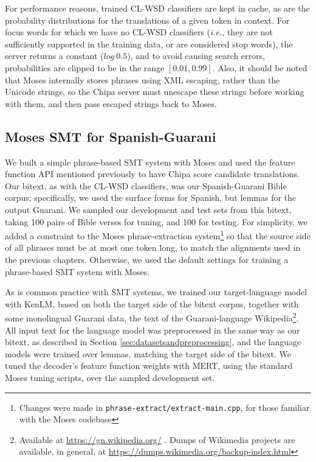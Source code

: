 For performance reasons, trained CL-WSD classifiers are kept in cache, as are
the probability distributions for the translations of a given token in context.
For focus words for which we have no CL-WSD classifiers (\emph{i.e.}, they are
not sufficiently supported in the training data, or are considered stop words),
the server returns a constant ($log\ 0.5$), and to avoid causing search errors,
probabilities are clipped to be in the range $[0.01, 0.99]$. Also, it should be
noted that Moses internally stores phrases using XML escaping, rather than the
Unicode strings, so the Chipa server must unescape these strings before working
with them, and then pass escaped strings back to Moses.

\subsection{Moses SMT for Spanish-Guarani}
We built a simple phrase-based SMT system with Moses and used the feature
function API mentioned previously to have Chipa score candidate translations.
Our bitext, as with the CL-WSD classifiers, was our Spanish-Guarani Bible
corpus; specifically, we used the surface forms for Spanish, but lemmas for the
output Guarani. We sampled our development and test sets from this bitext,
taking 100 pairs of Bible verses for tuning, and 100 for testing.  For
simplicity, we added a constraint to the Moses phrase-extraction
system\footnote{Changes were made in \texttt{phrase-extract/extract-main.cpp},
for those familiar with the Moses codebase} so that the source side of all
phrases must be at most one token long, to match the alignments used in the
previous chapters. Otherwise, we used the default settings for training a
phrase-based SMT system with Moses.

As is common practice with SMT systems, we trained our target-language model
with KenLM\cite{Heafield-kenlm}, based on both the target side of the bitext
corpus, together with some monolingual Guarani data, the text of the
Guarani-language Wikipedia\footnote{Available at
\url{https://gn.wikipedia.org/} . Dumps of Wikimedia projects are available, in
general, at \url{https://dumps.wikimedia.org/backup-index.html}}. All input
text for the language model was preprocessed in the same way as our bitext, as
described in Section \ref{sec:datasetsandpreprocessing}, and the language
models were trained over lemmas, matching the target side of the bitext. We
tuned the decoder's feature function weights with MERT, using the standard
Moses tuning scripts, over the sampled development set.

